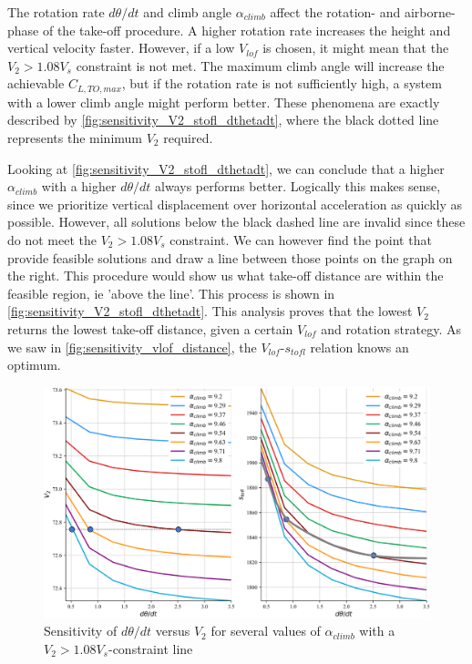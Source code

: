 The rotation rate $d\theta/dt$ and climb angle $\alpha_{climb}$ affect the rotation- and airborne-phase of the take-off procedure. A higher rotation rate increases the height and vertical velocity faster. However, if a low $V_{lof}$ is chosen, it might mean that the $V_2>1.08V_s$ constraint is not met. The maximum climb angle will increase the achievable $C_{L,TO,max}$, but if the rotation rate is not sufficiently high, a system with a lower climb angle might perform better. These phenomena are exactly described by \autoref{fig:sensitivity_V2_stofl_dthetadt}, where the black dotted line represents the minimum $V_2$ required.

Looking at \autoref{fig:sensitivity_V2_stofl_dthetadt}, we can conclude that a higher $\alpha_{climb}$ with a higher $d\theta/dt$ always performs better. Logically this makes sense, since we prioritize vertical displacement over horizontal acceleration as quickly as possible. However, all solutions below the black dashed line are invalid since these do not meet the $V_2>1.08V_s$ constraint. We can however find the point that provide feasible solutions and draw a line between those points on the graph on the right. This procedure would show us what take-off distance are within the feasible region, ie 'above the line'. This process is shown in \autoref{fig:sensitivity_V2_stofl_dthetadt}. This analysis proves that the lowest $V_2$ returns the lowest take-off distance, given a certain $V_{lof}$ and rotation strategy. As we saw in \autoref{fig:sensitivity_vlof_distance}, the $V_{lof}$-$s_{tofl}$ relation knows an optimum.

\begin{figure}[!ht]
    \centering
    \includegraphics[width=\linewidth]{figures/takeoff_V2.png}
    \caption{Sensitivity of $d\theta/dt$ versus $V_2$ for several values of $\alpha_{climb}$ with a $V_2>1.08V_s$-constraint line}
    \label{fig:sensitivity_V2_stofl_dthetadt}
\end{figure}

